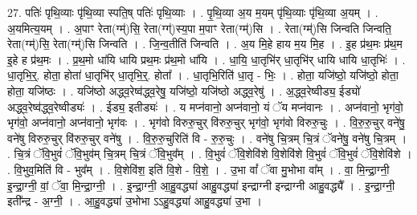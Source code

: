 \documentclass[17pt]{extarticle}
\begin{document}
27. पतिः॑ पृथि॒व्याः पृ॑थि॒व्या स्पति॒ष् पतिः॑ पृथि॒व्याः । . पृ॒थि॒व्या अ॒य म॒यम् पृ॑थि॒व्याः पृ॑थि॒व्या अ॒यम् । . अ॒यमित्य॒यम् । . अ॒पाꣳ रेता(ग्म्॑)सि॒ रेता(ग्ग्॑)स्य॒पा म॒पाꣳ रेता(ग्म्॑)सि । . रेता(ग्म्॑)सि जिन्वति जिन्वति॒ रेता(ग्म्॑)सि॒ रेता(ग्म्॑)सि जिन्वति । . जि॒न्व॒तीति॑ जिन्वति । . अ॒य मि॒हे हाय म॒य मि॒ह । . इ॒ह प्र॑थ॒मः प्र॑थ॒म इ॒हे ह प्र॑थ॒मः । . प्र॒थ॒मो धा॑यि धायि प्रथ॒मः प्र॑थ॒मो धा॑यि । . धा॒यि॒ धा॒तृभि॑र् धा॒तृभि॑र् धायि धायि धा॒तृभिः॑ । . धा॒तृभि॒र्॒. होता॒ होता॑ धा॒तृभि॑र् धा॒तृभि॒र्॒. होता᳚ । . धा॒तृभि॒रिति॑ धा॒तृ - भिः॒ । . होता॒ यजि॑ष्ठो॒ यजि॑ष्ठो॒ होता॒ होता॒ यजि॑ष्ठः । . यजि॑ष्ठो अद्ध्व॒रेष्व॑द्ध्व॒रेषु॒ यजि॑ष्ठो॒ यजि॑ष्ठो अद्ध्व॒रेषु॑ । . अ॒द्ध्व॒रेष्वीड्य॒ ईड्यो॑ अद्ध्व॒रेष्व॑द्ध्व॒रेष्वीड्यः॑ । . ईड्य॒ इतीड्यः॑ । . य मप्न॑वानो॒ अप्न॑वानो॒ यं ॅय मप्न॑वानः । . अप्न॑वानो॒ भृग॑वो॒ भृग॑वो॒ अप्न॑वानो॒ अप्न॑वानो॒ भृग॑वः । . भृग॑वो विरुरु॒चुर् वि॑रुरु॒चुर् भृग॑वो॒ भृग॑वो विरुरु॒चुः । . वि॒रु॒रु॒चुर् वने॑षु॒ वने॑षु विरुरु॒चुर् वि॑रुरु॒चुर् वने॑षु । . वि॒रु॒रु॒चुरिति॑ वि - रु॒रु॒चुः । . वने॑षु चि॒त्रम् चि॒त्रं ॅवने॑षु॒ वने॑षु चि॒त्रम् । . चि॒त्रं ॅवि॒भुवं॑ ॅवि॒भुव॑म् चि॒त्रम् चि॒त्रं ॅवि॒भुव᳚म् । . वि॒भुवं॑ ॅवि॒शेवि॑शे वि॒शेवि॑शे वि॒भुवं॑ ॅवि॒भुवं॑ ॅवि॒शेवि॑शे । . वि॒भुव॒मिति॑ वि - भुव᳚म् । . वि॒शेवि॑श॒ इति॑ वि॒शे - वि॒शे॒ । . उ॒भा वां᳚ ॅवा मु॒भोभा वा᳚म् । . वा॒ मि॒न्द्रा॒ग्नी॒ इ॒न्द्रा॒ग्नी॒ वां॒ ॅवा॒ मि॒न्द्रा॒ग्नी॒ । . इ॒न्द्रा॒ग्नी॒ आ॒हु॒वद्ध्या॑ आहु॒वद्ध्या॑ इन्द्राग्नी इन्द्राग्नी आहु॒वद्ध्यै᳚ । . इ॒न्द्रा॒ग्नी॒ इती᳚न्द्र - अ॒ग्नी॒ । . आ॒हु॒वद्ध्या॑ उ॒भोभा ऽऽहु॒वद्ध्या॑ आहु॒वद्ध्या॑ उ॒भा । \newline
\end{document}
